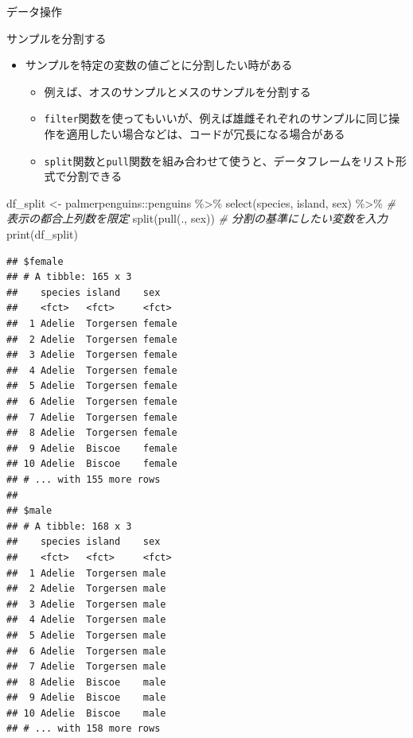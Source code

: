 \documentclass[
  ignorenonframetext,
]{beamer}
\newenvironment{Shaded}{\begin{snugshade}}{\end{snugshade}}
\newcommand{\CommentTok}[1]{\textcolor[rgb]{0.56,0.35,0.01}{\textit{#1}}}
\newcommand{\FunctionTok}[1]{\textcolor[rgb]{0.00,0.00,0.00}{#1}}
\newcommand{\NormalTok}[1]{#1}
\newcommand{\OtherTok}[1]{\textcolor[rgb]{0.56,0.35,0.01}{#1}}
\newcommand{\SpecialCharTok}[1]{\textcolor[rgb]{0.00,0.00,0.00}{#1}}
\providecommand{\tightlist}{%
  \setlength{\itemsep}{0pt}\setlength{\parskip}{0pt}}
\begin{document}
\begin{frame}[fragile]{データ操作}
\begin{block}{サンプルを分割する}
\protect\hypertarget{ux30b5ux30f3ux30d7ux30ebux3092ux5206ux5272ux3059ux308b}{}
\begin{itemize}
\tightlist
\item
  サンプルを特定の変数の値ごとに分割したい時がある

  \begin{itemize}
  \tightlist
  \item
    例えば、オスのサンプルとメスのサンプルを分割する
  \item
    \texttt{filter}関数を使ってもいいが、例えば雄雌それぞれのサンプルに同じ操作を適用したい場合などは、コードが冗長になる場合がある
  \item
    \texttt{split}関数と\texttt{pull}関数を組み合わせて使うと、データフレームをリスト形式で分割できる
  \end{itemize}
\end{itemize}

\begin{Shaded}
\begin{Highlighting}[]
\NormalTok{df\_split }\OtherTok{\textless{}{-}}\NormalTok{ palmerpenguins}\SpecialCharTok{::}\NormalTok{penguins }\SpecialCharTok{\%\textgreater{}\%}
  \FunctionTok{select}\NormalTok{(species, island, sex) }\SpecialCharTok{\%\textgreater{}\%} \CommentTok{\# 表示の都合上列数を限定}
  \FunctionTok{split}\NormalTok{(}\FunctionTok{pull}\NormalTok{(., sex)) }\CommentTok{\# 分割の基準にしたい変数を入力}
\FunctionTok{print}\NormalTok{(df\_split)}
\end{Highlighting}
\end{Shaded}

\begin{verbatim}
## $female
## # A tibble: 165 x 3
##    species island    sex   
##    <fct>   <fct>     <fct> 
##  1 Adelie  Torgersen female
##  2 Adelie  Torgersen female
##  3 Adelie  Torgersen female
##  4 Adelie  Torgersen female
##  5 Adelie  Torgersen female
##  6 Adelie  Torgersen female
##  7 Adelie  Torgersen female
##  8 Adelie  Torgersen female
##  9 Adelie  Biscoe    female
## 10 Adelie  Biscoe    female
## # ... with 155 more rows
## 
## $male
## # A tibble: 168 x 3
##    species island    sex  
##    <fct>   <fct>     <fct>
##  1 Adelie  Torgersen male 
##  2 Adelie  Torgersen male 
##  3 Adelie  Torgersen male 
##  4 Adelie  Torgersen male 
##  5 Adelie  Torgersen male 
##  6 Adelie  Torgersen male 
##  7 Adelie  Torgersen male 
##  8 Adelie  Biscoe    male 
##  9 Adelie  Biscoe    male 
## 10 Adelie  Biscoe    male 
## # ... with 158 more rows
\end{verbatim}
\end{block}


\end{frame}
\end{document}
